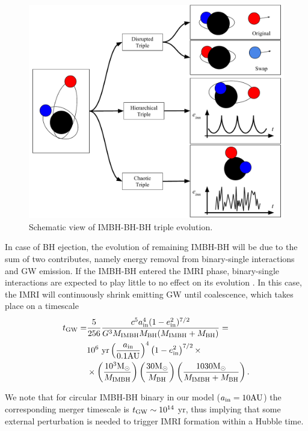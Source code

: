 \documentclass[useAMS,usenatbib]{mn2e}
\newcommand{\Ms}{{\rm M}_\odot}
\newcommand{\au}{{\rm AU}}
\newcommand{\gw}{{\rm GW}}
\newcommand{\ibh}{{\rm IMBH}}
\newcommand{\inn}{{\rm in}}
\newcommand{\bh}{{\rm BH}}
\begin{document}
\begin{figure}
    \centering
    \includegraphics[width=16cm]{Sketch_IMRI}
    \caption{Schematic view of IMBH-BH-BH triple evolution.}
    \label{fig:f3}
\end{figure}

In case of BH ejection, the evolution of remaining IMBH-BH will be due to the sum of two contributes, namely energy removal from binary-single interactions and GW emission. If the IMBH-BH entered the IMRI phase, binary-single interactions are expected to play little to no effect on its evolution \citep{seoane18}. In this case, the IMRI will continuously shrink emitting GW until coalescence, which takes place on a timescale \citep{peters64}
\begin{align}
t_\gw =&  \displaystyle \frac{5}{256}\frac{c^5 a_\inn^4 (1-e_\inn^2)^{7/2}}{G^3M_\ibh M_\bh(M_\ibh+M_\bh)} = \nonumber \\
       & 10^6{\rm ~yr}\left(\frac{a_\inn}{0.1\au}\right)^4\left(1-e_\inn^2\right)^{7/2}\times \nonumber \\ 
       & \times \left(\frac{10^3\Ms}{M_\ibh}\right) \left(\frac{30\Ms}{M_\bh}\right)\left(\frac{1030\Ms}{M_\ibh+M_\bh}\right).
\label{peters}
\end{align}

We note that for circular IMBH-BH binary in our model ($a_\inn=10\au$) the corresponding merger timescale is $t_\gw \sim 10^{14}$ yr, thus implying that some external perturbation is needed to trigger IMRI formation within a Hubble time.
\end{document}
